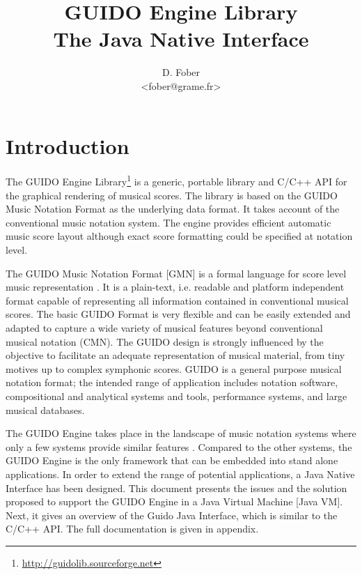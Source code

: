 \documentclass[a4paper]{article}
\begin{document}
\title{GUIDO Engine Library \\ 
{\huge The Java Native Interface}}


\author{D. Fober\\
{\small <fober@grame.fr>}
}

\date{}

\maketitle

\section{Introduction}

The GUIDO Engine Library\footnote{\url{http://guidolib.sourceforge.net}} is a generic, portable library and C/C++ API for the graphical rendering of musical scores. The library is based on the GUIDO Music Notation Format as the underlying data format. It takes account of the conventional music notation system. The engine provides efficient automatic music score layout \cite{RENZ02} although exact score formatting could be specified at notation level. 

The GUIDO Music Notation Format [GMN] is a formal language for score level music representation \cite{hoos98}. It is a plain-text, i.e. readable and platform independent format capable of representing all information contained in conventional musical scores. The basic GUIDO Format is very flexible and can be easily extended and adapted to capture a wide variety of musical features beyond conventional musical notation (CMN). The GUIDO design is strongly influenced by the objective to facilitate an adequate representation of musical material, from tiny motives up to complex symphonic scores. GUIDO is a general purpose musical notation format; the intended range of application includes notation software, compositional and analytical systems and tools, performance systems, and large musical databases.

The GUIDO Engine takes place in the landscape of music notation systems where only a few systems provide similar features \cite{CMN,Hamel98,KUUSK06,lilypond03}. Compared to the other systems, the GUIDO Engine is the only framework that can be embedded into stand alone applications. In order to extend the range of potential applications, a Java Native Interface has been designed. This document presents the issues and the solution proposed to support the GUIDO Engine in a Java Virtual Machine [Java VM]. Next, it gives an overview of the Guido Java Interface, which is similar to the C/C++ API. The full documentation is given in appendix.
\end{document}
